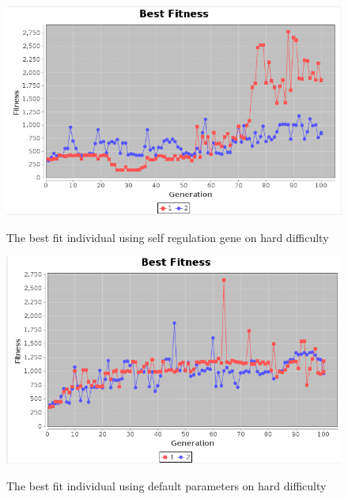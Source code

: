 \documentclass[12pt]{ucthesis} \newif\ifpdf \ifx\pdfoutput\undefined
\begin{document}
\begin{figure}[h!]
  \caption{The best fit individual using self regulation gene on hard
  difficulty}
  \centering
    \includegraphics[width=1\textwidth]{graphsone/selfreg_default_hard_best.png}
   \label{fig:selfreg_default_hard_best} 
\end{figure}

\begin{figure}[h!]
  \caption{The best fit individual using default parameters on hard difficulty}
  \centering
    \includegraphics[width=1\textwidth]{graphsone/default_hard_best.png}
   \label{fig:default_hard_best} 
\end{figure}
\end{document}

